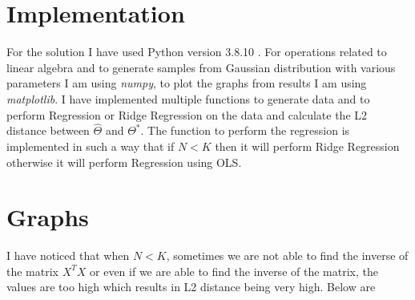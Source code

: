 \documentclass{article}
\begin{document}
\thispagestyle{firstpage}


\section*{Implementation}

For the solution I have used Python version 3.8.10 . For operations related to linear algebra and to generate samples from Gaussian distribution with various parameters I am using \emph{numpy}, to plot the graphs from results I am using \emph{matplotlib}. I have implemented multiple functions to generate data and to perform Regression or Ridge Regression on the data and calculate the L2 distance between $\hat{\Theta}$ and $\Theta^{*}$. The function to perform the regression is implemented in such a way that if $N<K$ then it will perform Ridge Regression otherwise it will perform Regression using OLS.

\section*{Graphs}

I have noticed that when $N<K$, sometimes we are not able to find the inverse of the matrix $X^{T}X$ or even if we are able to find the inverse of the matrix, the values are too high which results in L2 distance being very high. Below are 
\end{document}
